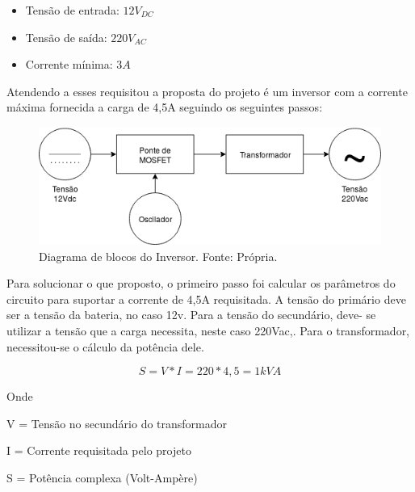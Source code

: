                 \begin{itemize}
                	\item Tensão de entrada: $12V_{DC}$
                	\item Tensão de saída: $220V_{AC}$
                	\item Corrente mínima: $3A$
                \end{itemize}
                
                Atendendo a esses requisitou a proposta do projeto é um inversor com a 							corrente máxima fornecida a carga de 4,5A seguindo os seguintes passos:
                
                \begin{figure}[!htb]
            		\centering
            		\includegraphics[scale= 0.4]{figuras/Diagrama_Inversor.png}
            		\caption{Diagrama de blocos do Inversor. Fonte: Própria.}
            		\label{diagrama-inversor}
            	\end{figure}    
            	
            	Para solucionar o que proposto, o primeiro passo foi calcular os parâmetros do 				circuito para suportar a corrente de 4,5A requisitada. A tensão do primário 					deve ser a tensão da bateria, no caso 12v. Para a tensão do secundário, deve-					se utilizar a tensão que a carga necessita, neste caso 220Vac,. Para o 							transformador, necessitou-se o cálculo da potência dele.    
            	
            	\begin{equation}
                	S = V*I = 220*4,5 = 1kVA
            	\end{equation}
                
                Onde	
                
                V = Tensão no secundário do transformador
                
				I = Corrente requisitada pelo projeto
	
				S = Potência complexa (Volt-Ampère)
				
